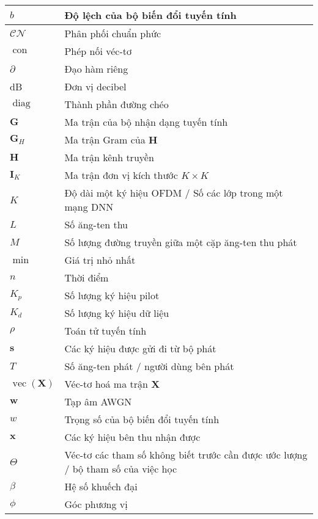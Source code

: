 {{\begin{longtable}{|>{\raggedright}p{4.4cm}|p{10.4cm}|}
$b$ & Độ lệch của bộ biến đổi tuyến tính \\ 
\hline
$\mathcal{CN}$ & Phân phối chuẩn phức \\ 
\hline
$\operatorname{con}$ & Phép nối véc-tơ\\ 
\hline
$\partial$ & Đạo hàm riêng \\ 
\hline
dB & Đơn vị decibel \\ 
\hline
$\operatorname{diag}$ & Thành phần đường chéo \\ 
\hline
$\mathbf{G}$ & Ma trận của bộ nhận dạng tuyến tính \\ 
\hline
$\mathbf{G}_H$ & Ma trận Gram của $\mathbf{H}$ \\ 
\hline
$\mathbf{H}$ & Ma trận kênh truyền \\ 
\hline
$\mathbf{I}_K$ & Ma trận đơn vị kích thước $K \times K$ \\ 
\hline
$K$ & Độ dài một ký hiệu OFDM / Số các lớp trong một mạng DNN \\ 
\hline
$L$ & Số ăng-ten thu \\ 
\hline
$M$ & Số lượng đường truyền giữa một cặp ăng-ten thu phát \\ 
\hline
$\operatorname{min}$ & Giá trị nhỏ nhất \\ 
\hline
$n$ & Thời điểm \\ 
\hline
$K_p$ & Số lượng ký hiệu pilot \\ 
\hline
$K_d$ & Số lượng ký hiệu dữ liệu \\ 
\hline
$\rho$ & Toán tử tuyến tính \\ 
\hline
$\mathbf{s}$ & Các ký hiệu được gửi đi từ bộ phát \\ 
\hline
$T$ & Số ăng-ten phát / người dùng bên phát \\ 
\hline
$\operatorname{vec}(\mathbf{X})$ & Véc-tơ hoá ma trận $\mathbf{X}$ \\ 
\hline
$\mathbf{w}$ & Tạp âm AWGN \\ 
\hline
$w$ & Trọng số của bộ biến đổi tuyến tính \\ 
\hline
$\mathbf{x}$ & Các ký hiệu bên thu nhận được \\ 
\hline
$\Theta$ & Véc-tơ các tham số không biết trước cần được ước lượng / bộ tham số của việc học \\ 
\hline
$\beta$ & Hệ số khuếch đại \\ 
\hline
$\phi$ & Góc phương vị \\
\hline
\end{longtable}
}}
\newpage

